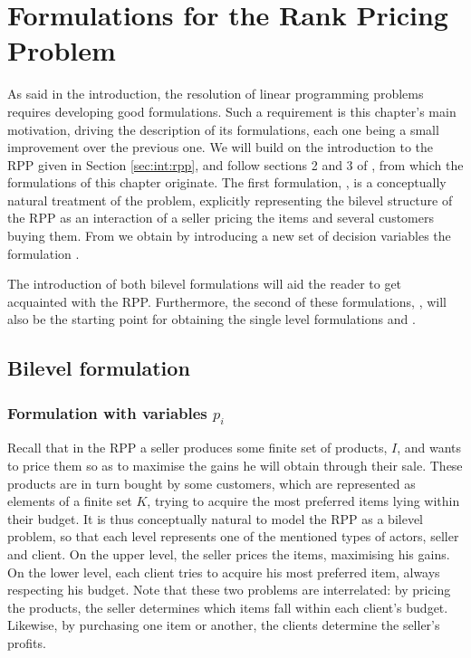 \chapter{Formulations for the Rank Pricing Problem}
\label{chp:problem-formulations}

As said in the introduction, the resolution of linear programming problems
requires developing good formulations. Such a requirement is this chapter's main
motivation, driving the description of its formulations, each one being a small
improvement over the previous one. We will build on the introduction to the RPP
given in Section \ref{sec:int:rpp}, and follow sections 2 and 3 of
\cite{ca:rpp}, from which the formulations of this chapter originate.  The first
formulation, \bnlp, is a conceptually natural treatment of the problem,
explicitly representing the bilevel structure of the RPP as an interaction of a
seller pricing the items and several customers buying them.  From \bnlp we
obtain by introducing a new set of decision variables the formulation \bnlv.

The introduction of both bilevel formulations will aid the reader to get
acquainted with the RPP. Furthermore, the second of these formulations, \bnlv,
will also be the starting point for obtaining the single level formulations \bnl
and \slnl.

\section{Bilevel formulation} %
\label{sec:pf:bilevel-formulation}

\subsection{Formulation with variables $p_i$} %
\label{ssc:pf:bf:bnlp}

Recall that in the RPP a seller produces some finite set of products, $I$, and
wants to price them so as to maximise the gains he will obtain through their
sale. These products are in turn bought by some customers, which are represented
as elements of a finite set $K$, trying to acquire the most preferred items
lying within their budget. It is thus conceptually natural to model the RPP as a
bilevel problem, so that each level represents one of the mentioned types of
actors, seller and client. On the upper level, the seller prices the items,
maximising his gains. On the lower level, each client tries to acquire his most
preferred item, always respecting his budget. Note that these two problems are
interrelated: by pricing the products, the seller determines which items fall
within each client's budget. Likewise, by purchasing one item or another, the
clients determine the seller's profits.

